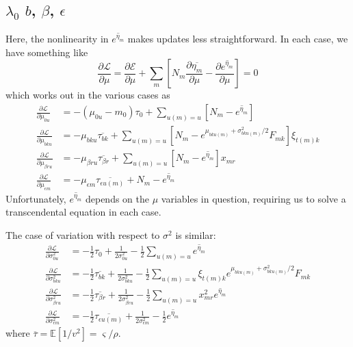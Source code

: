 \documentclass[11pt]{article}
\begin{document}
\subsection{$\lambda_0$ $b$, $\beta$, $\epsilon$}
Here, the nonlinearity in $\overline{e^{\eta_m}}$ makes updates less straightforward. In each case, we have something like
\begin{equation}
    \frac{\partial\mathcal{L}}{\partial \mu} = \frac{\partial\mathcal{E}}{\partial \mu} + \sum_{m} \left[N_{m} \frac{\partial\overline{\eta_{m}}}{\partial \mu} - \frac{\partial\overline{e^{\eta_{m}}}}{\partial \mu}\right] = 0
\end{equation}
which works out in the various cases as
\begin{align}
    \frac{\partial\mathcal{L}}{\partial \mu_{0u}} &= -(\mu_{0u} - m_0)\tau_0 + \sum_{u(m) = u} [N_{m} - \overline{e^{\eta_{m}}}] \\
    \frac{\partial\mathcal{L}}{\partial \mu_{bku}} &= 
    - \mu_{bku} \overline{\tau_{bk}} + \sum_{u(m) = u} [N_{m} - e^{\mu_{bku(m)} + \sigma^2_{bku(m)} / 2} F_{mk} ] \xi_{t(m) k} \\
    \frac{\partial\mathcal{L}}{\partial \mu_{\beta ru}} &= 
    - \mu_{\beta ru} \overline{\tau_{\beta r}} + \sum_{u(m) = u} [N_{m} - \overline{e^{\eta_{m}}}] x_{mr}  \\
    \frac{\partial\mathcal{L}}{\partial \mu_{\epsilon m}} &= 
    - \mu_{\epsilon m} \overline{\tau_{\epsilon u(m)}} + N_{m} - 
    \overline{e^{\eta_m}}
\end{align}
Unfortunately, $\overline{e^{\eta_m}}$ depends on the $\mu$ variables in question, requiring us to solve a transcendental equation in each case.

The case of variation with respect to $\sigma^2$ is similar:
\begin{align}
    \frac{\partial\mathcal{L}}{\partial \sigma^2_{0u}} &= -\frac{1}{2}\tau_0 + \frac{1}{2\sigma^2_{0u}} - \frac{1}{2} \sum_{u(m) = u} \overline{e^{\eta_m}} \\
    \frac{\partial\mathcal{L}}{\partial \sigma^2_{bku}} &= 
    - \frac{1}{2} \overline{\tau_{bk}} + \frac{1}{2\sigma^2_{bku}} - \frac{1}{2}\sum_{u(m) = u} \xi_{t(m)k} e^{\mu_{bku(m)} + \sigma^2_{bku(m)} / 2} F_{mk}  \\
    \frac{\partial\mathcal{L}}{\partial \sigma^2_{\beta ru}} &= 
    - \frac{1}{2} \overline{\tau_{\beta r}} + \frac{1}{2\sigma^2_{\beta ru}} - \frac{1}{2} \sum_{u(m) = u} x^2_{mr} \overline{e^{\eta_m}} \\
    \frac{\partial\mathcal{L}}{\partial \sigma^2_{\epsilon m}} &= 
    -\frac{1}{2} \overline{\tau_{\epsilon u(m)}} + \frac{1}{2\sigma^2_{\epsilon m}} - \frac{1}{2} \overline{e^{\eta_m}}
\end{align}
where $\overline{\tau} = \mathbb{E}[1/v^2] = \varsigma / \rho$.
\end{document}
